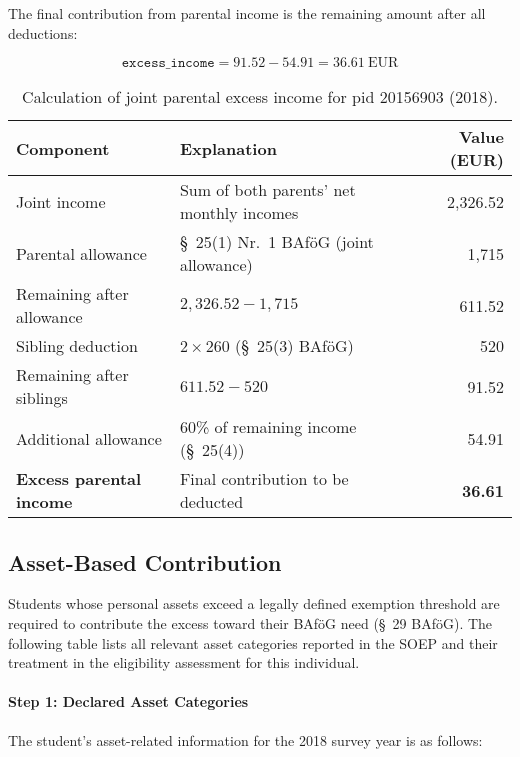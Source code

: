 The final contribution from parental income is the remaining amount after all deductions:

\[
\texttt{excess\_income} = 91.52 - 54.91 = 36.61~\text{EUR}
\]

\begin{table}[H]
\scriptsize
\centering
\begin{tabular}{llr}
\toprule
\textbf{Component} & \textbf{Explanation} & \textbf{Value (EUR)} \\
\midrule
Joint income & Sum of both parents’ net monthly incomes & 2,326.52 \\
Parental allowance & §~25(1) Nr.~1 BAföG (joint allowance) & 1,715 \\
Remaining after allowance & $2{,}326.52 - 1{,}715$ & 611.52 \\
Sibling deduction & $2 \times 260$ (§~25(3) BAföG) & 520 \\
Remaining after siblings & $611.52 - 520$ & 91.52 \\
Additional allowance & 60\% of remaining income (§~25(4)) & 54.91 \\
\midrule
\textbf{Excess parental income} & Final contribution to be deducted & \textbf{36.61} \\
\bottomrule
\end{tabular}
\caption{Calculation of joint parental excess income for pid 20156903 (2018).}
\label{table:bafoeg_joint_income}
\end{table}


\subsection{Asset-Based Contribution}

Students whose personal assets exceed a legally defined exemption threshold are required to contribute the excess toward their BAföG need (§~29 BAföG). The following table lists all relevant asset categories reported in the SOEP and their treatment in the eligibility assessment for this individual.

\paragraph{Step 1: Declared Asset Categories}

The student’s asset-related information for the 2018 survey year is as follows:

